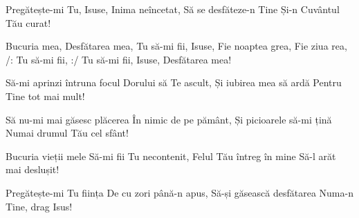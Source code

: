 \beginverse
Pregătește-mi Tu, Isuse,
Inima neîncetat,
Să se desfăteze-n Tine
Și-n Cuvântul Tău curat!
\endverse

\beginchorus
Bucuria mea,
Desfătarea mea,
Tu să-mi fii, Isuse,
Fie noaptea grea,
Fie ziua rea,
/: Tu să-mi fii, :/
Tu să-mi fii, Isuse,
Desfătarea mea!
\endchorus

\beginverse
Să-mi aprinzi întruna focul
Dorului să Te ascult,
Și iubirea mea să ardă
Pentru Tine tot mai mult!
\endverse

\beginverse
Să nu-mi mai găsesc plăcerea
În nimic de pe pământ,
Și picioarele să-mi țină
Numai drumul Tău cel sfânt!
\endverse

\beginverse
Bucuria vieții mele
Să-mi fii Tu necontenit,
Felul Tău întreg în mine
Să-l arăt mai deslușit!
\endverse

\beginverse
Pregătește-mi Tu ființa
De cu zori până-n apus,
Să-și găsească desfătarea
Numa-n Tine, drag Isus!
\endverse
\endsong